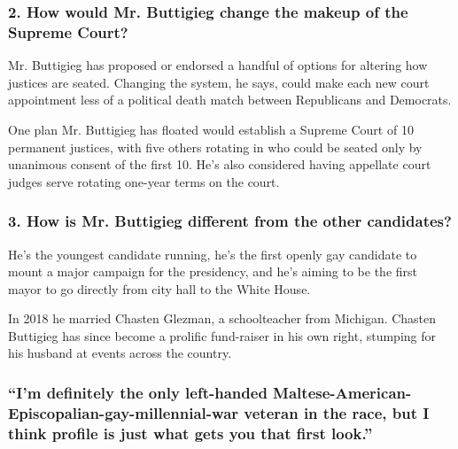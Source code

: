 \hypertarget{2-how-would-mr-buttigieg-change-the-makeup-of-the-supreme-court}{%
\subsubsection{\texorpdfstring{\textbf{2. How would Mr. Buttigieg change
the makeup of the Supreme
Court?}}{2. How would Mr. Buttigieg change the makeup of the Supreme Court?}}\label{2-how-would-mr-buttigieg-change-the-makeup-of-the-supreme-court}}

Mr. Buttigieg has proposed or endorsed a handful of options for altering
how justices are seated. Changing the system, he says, could make each
new court appointment less of a political death match between
Republicans and Democrats.

One plan Mr. Buttigieg has floated would establish a Supreme Court of 10
permanent justices, with five others rotating in who could be seated
only by unanimous consent of the first 10. He's also considered having
appellate court judges serve rotating one-year terms on the court.

\hypertarget{3-how-is-mr-buttigieg-different-from-the-other-candidates}{%
\subsubsection{\texorpdfstring{\textbf{3. How is Mr. Buttigieg different
from the other
candidates?}}{3. How is Mr. Buttigieg different from the other candidates?}}\label{3-how-is-mr-buttigieg-different-from-the-other-candidates}}

He's the youngest candidate running, he's the first openly gay candidate
to mount a major campaign for the presidency, and he's aiming to be the
first mayor to go directly from city hall to the White House.

In 2018 he married Chasten Glezman, a schoolteacher from Michigan.
Chasten Buttigieg has since become a prolific fund-raiser in his own
right, stumping for his husband at events across the country.

\hypertarget{im-definitely-the-only-left-handed-maltese-american-episcopalian-gay-millennial-war-veteran-in-the-race-but-i-think-profile-is-just-what-gets-you-that-first-look}{%
\subsubsection{``I'm definitely the only left-handed
Maltese-American-Episcopalian-gay-millennial-war veteran in the race,
but I think profile is just what gets you that first
look.''}\label{im-definitely-the-only-left-handed-maltese-american-episcopalian-gay-millennial-war-veteran-in-the-race-but-i-think-profile-is-just-what-gets-you-that-first-look}}

